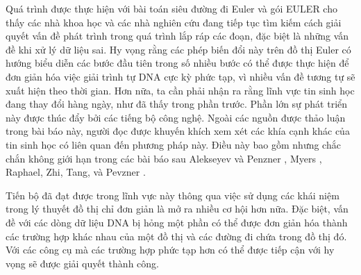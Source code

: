 \documentclass[14pt, a4paper]{article}
\numberwithin{equation}{section}
\numberwithin{figure}{section}
\numberwithin{dl}{section}
\numberwithin{md}{section}
\numberwithin{bd}{section}
\numberwithin{dn}{section}
\numberwithin{hq}{section}
\begin{document}
    Quá trình được thực hiện với bài toán siêu đường đi Euler và gói EULER cho thấy các nhà khoa học và các nhà nghiên cứu đang tiếp tục tìm kiếm cách giải quyết vấn đề phát trình trong quá trình lắp ráp các đoạn, đặc biệt là những vấn đề khi xử lý dữ liệu sai.
    Hy vọng rằng các phép biến đổi này trên đồ thị Euler có hướng biểu diễn các bước đầu tiên trong số nhiều bước có thể được thực hiện để đơn giản hóa việc giải trình tự DNA cực kỳ phức tạp, vì nhiều vấn đề tương tự sẽ xuất hiện theo thời gian.
    Hơn nữa, ta cần phải nhận ra rằng lĩnh vực tin sinh học đang thay đổi hàng ngày, như đã thấy trong phần trước.
    Phần lớn sự phát triển này được thúc đẩy bởi các tiếng bộ công nghệ.
    Ngoài các nguồn được thảo luận trong bài báo này, người đọc được khuyến khích xem xét các khía cạnh khác của tin sinh học có liên quan đến phương pháp này.
    Điều này bao gồm nhưng chắc chắn không giới hạn trong các bài báo sau Alekseyev và Penzner \cite{alekseyev2007colored}, Myers \cite{myers2005fragment}, Raphael, Zhi, Tang, và Pevzner \cite{raphael2004novel}. 

    Tiến bộ đã đạt được trong lĩnh vực này thông qua việc sử dụng các khái niệm trong lý thuyết đồ thị chỉ đơn giản là mở ra nhiều cơ hội hơn nữa.
    Đặc biệt, vấn đề với các dòng dữ liệu DNA bị hỏng một phần có thể được đơn giản hóa thành các trường hợp khác nhau của một đồ thị và các đường đi chứa trong đồ thị đó.
    Với các công cụ mà các trường hợp phức tạp hơn có thể được tiếp cận với hy vọng sẽ được giải quyết thành công.

    \newpage
    \printbibliography[title={TÀI LIỆU THAM KHẢO}]
\end{document}
